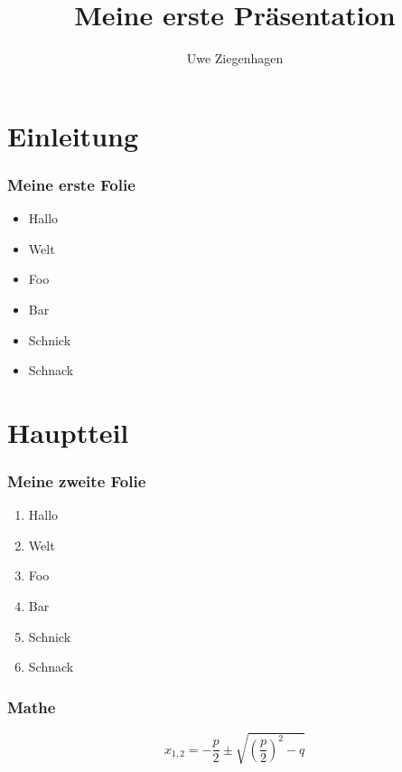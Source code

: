 \documentclass[12pt,ngerman]{beamer}
\title{Meine erste Präsentation}
\author{Uwe Ziegenhagen}
\institute{FernUni Hagen}
\begin{document}
\begin{frame}

\maketitle

\end{frame}

\begin{frame}

\tableofcontents

\end{frame}


\section{Einleitung}

\begin{frame}
\frametitle{Meine erste Folie}

\begin{itemize}
	\item Hallo
	\item Welt
	\item Foo
 	\item Bar
	\item Schnick
	\item Schnack
\end{itemize}

\end{frame}

\section{Hauptteil}

\begin{frame}
\frametitle{Meine zweite Folie}

\begin{enumerate}
	\item Hallo
	\item Welt
	\item Foo
 	\item Bar
	\item Schnick
	\item Schnack
\end{enumerate}

\end{frame}

\begin{frame}
\frametitle{Mathe}

\begin{equation}
x_{1,2} = -\frac{p}{2} \pm \sqrt{\left(\frac{p}{2} \right)^2-q}
\end{equation}


\end{frame}
\end{document}
